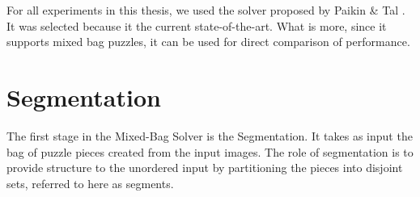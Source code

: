 For all experiments in this thesis, we used the solver proposed by Paikin \& Tal \cite{paikin2015}.  It was selected because it the current state-of-the-art.  What is more, since it supports mixed bag puzzles, it can be used for direct comparison of performance.

\section{Segmentation}\label{sec:Segmentation}

The first stage in the Mixed-Bag Solver is the Segmentation.  It takes as input the bag of puzzle pieces created from the input images.  The role of segmentation is to provide structure to the unordered input by partitioning the pieces into disjoint sets, referred to here as segments.